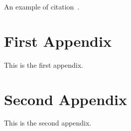 \documentclass[wcp]{jmlr}
\begin{document}
An example of citation~\cite{DBLP:conf/acml/2009}.


%


\appendix

\section{First Appendix}\label{apd:first}

This is the first appendix.

\section{Second Appendix}\label{apd:second}

This is the second appendix.
\end{document}
